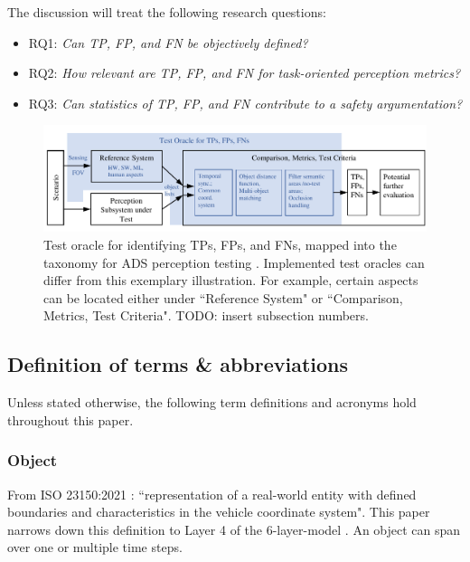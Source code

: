 \documentclass[conference]{IEEEtran}
\begin{document}
The discussion will treat the following research questions:
\begin{itemize}


\item {RQ1}: \textit{Can TP, FP, and FN be objectively defined?}

\item {RQ2}: \textit{How relevant are TP, FP, and FN for task-oriented perception metrics?}

\item {RQ3}: \textit{Can statistics of TP, FP, and FN contribute to a safety argumentation?}
\end{itemize}

\begin{figure}[t]
	\centering
	\vspace*{2mm}
	\includegraphics[width=\textwidth]{img/taxonomy_with_oracle.pdf}
	
	\caption{Test oracle for identifying TPs, FPs, and FNs, mapped into the taxonomy for ADS perception testing \cite{Hoss2022review, stellet2015testing}. Implemented test oracles can differ from this exemplary illustration. For example, certain aspects can be located either under ``Reference System" or ``Comparison, Metrics, Test Criteria".
		TODO: insert subsection numbers.
	}
	\label{fig:oracle_in_taxonomy}
\end{figure}


\subsection{Definition of terms \& abbreviations}
Unless stated otherwise, the following term definitions and acronyms hold throughout this paper.

\subsubsection{Object} \label{def:object}
From ISO 23150:2021 \cite{ISO_23150_2021_data_communication}: 
``representation of a real-world entity with defined boundaries and characteristics in the vehicle coordinate system".
This paper narrows down this definition to Layer 4 of the 6-layer-model \cite{Scholtes20216lmAccess}. An object can span over one or multiple time steps. 
\end{document}
